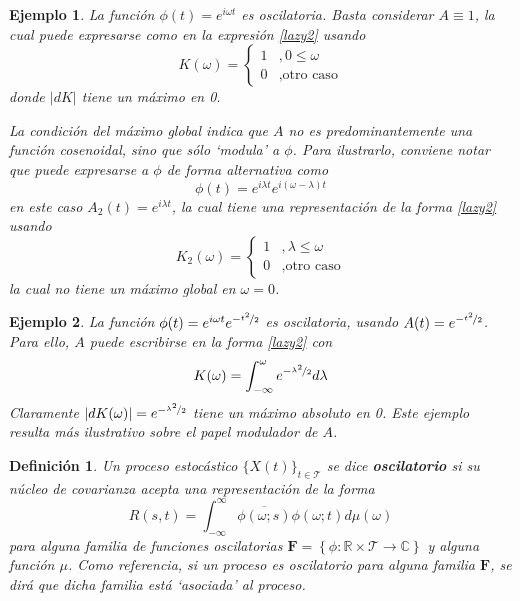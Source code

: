 \documentclass[12pt,letterpaper]{book}
\newtheorem{definicion}{Definición}[chapter]
\newtheorem{ejemplo}{Ejemplo}[chapter]
\newcommand{\R}{\mathbb{R}}
\newcommand{\C}{\mathbb{C}}
\newcommand{\intR}{\int_{-\infty}^{\infty}}
\newcommand{\ef}{\mathbf{F}}
\newcommand{\abso}[1]{\left| #1 \right|}
\newcommand{\xt}{$\{X(t)\}_{t\in \mathcal{T}}$ }
\begin{document}
\begin{ejemplo}
\label{ejemplo:sen_cos_oscilatorios}
La función $\phi(t) = e^{i \omega t}$ es oscilatoria. 
%
Basta considerar $A \equiv 1$, la cual puede expresarse como en la expresión \ref{lazy2} usando \begin{equation}
K(\omega) = \begin{cases}
1 &, 0 \leq \omega \\
0 &, \text{otro caso}
\end{cases}
\end{equation}
donde $\abso{dK}$ tiene un máximo en 0. 

La condición del máximo global indica que $A$ no es \textit{predominantemente} una función cosenoidal, sino que sólo \textit{`modula'} a $\phi$.
%
Para ilustrarlo, conviene notar que puede expresarse a $\phi$ de forma alternativa como
\begin{equation}
\phi(t) = e^{i \lambda t} e^{i (\omega-\lambda) t}
\end{equation} 
en este caso $A_2(t) = e^{i \lambda t}$, la cual tiene una representación de la forma \ref{lazy2} usando
\begin{equation}
K_2(\omega) = \begin{cases}
1 &, \lambda \leq \omega \\
0 &, \text{otro caso}
\end{cases}
\end{equation}
la cual no tiene un máximo global en $\omega=0$.
\end{ejemplo}

\begin{ejemplo}
\label{ejemplo:oscilatorios2}
La función $\phi(t) = e^{i \omega t} e^{-\nicefrac{t^2}{2}}$ es oscilatoria, usando $A(t) = e^{-\nicefrac{t^2}{2}}$.
% 
Para ello, $A$ puede escribirse en la forma \ref{lazy2} con 
\begin{equation}
K(\omega) = \int_{-\infty}^{\omega}  e^{-\nicefrac{\lambda^2}{2}} d\lambda
\end{equation}
Claramente $\abso{dK(\omega)} = e^{-\nicefrac{\lambda^2}{2}}$ tiene un máximo absoluto en 0.
%
Este ejemplo resulta más ilustrativo sobre el papel \textit{modulador} de $A$. 
\end{ejemplo}

\begin{definicion}
\label{def:proc_oscilatorio}
Un proceso estocástico \xt se dice \textbf{oscilatorio} si su núcleo de covarianza acepta una representación de la forma
\begin{equation}
R(s,t) = \intR \overline{\phi(\omega;s)}\phi(\omega;t) d\mu(\omega)
\end{equation}
para alguna familia de funciones oscilatorias $\ef = \left\{ \phi: \R \times \mathcal{T} \rightarrow \C \right\}$ y alguna función $\mu$.
%
Como referencia, si un proceso es oscilatorio para alguna familia $\ef$, se dirá que dicha familia está \textit{`asociada'} al proceso.
\end{definicion}
\end{document}
